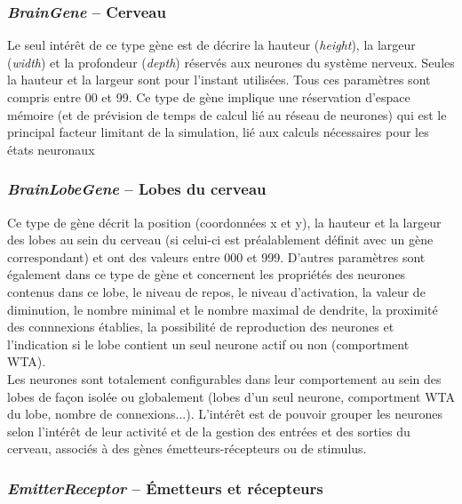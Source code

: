 \documentclass[11pt,twoside,a4paper]{article}
\begin{document}
\subsubsection{\emph{BrainGene} -- Cerveau}

Le seul int{\'e}r{\^e}t de ce type g{\`e}ne est de d{\'e}crire la hauteur (\textit{height}), la largeur (\textit{width}) et la profondeur (\textit{depth}) r{\'e}serv{\'e}s aux neurones du syst{\`e}me nerveux. Seules la hauteur et la largeur sont pour l'instant utilis{\'e}es. Tous ces param{\`e}tres sont compris entre 00 et 99. Ce type de g{\`e}ne implique une r{\'e}servation d'espace m{\'e}moire (et de pr{\'e}vision de temps de calcul li{\'e} au r{\'e}seau de neurones) qui est le principal facteur limitant de la simulation, li{\'e} aux calculs n{\'e}cessaires pour les {\'e}tats neuronaux

\subsubsection{\emph{BrainLobeGene} -- Lobes du cerveau}

Ce type de g{\`e}ne d{\'e}crit la position (coordonn{\'e}es x et y), la hauteur et la largeur des lobes au sein du cerveau (si celui-ci est pr{\'e}alablement d{\'e}finit avec un g{\`e}ne correspondant) et ont des valeurs entre 000 et 999. D'autres param{\`e}tres sont {\'e}galement dans ce type de g{\`e}ne et concernent les propri{\'e}t{\'e}s des neurones contenus dans ce lobe, le niveau de repos, le niveau d'activation, la valeur de diminution, le nombre minimal et le nombre maximal de dendrite, la proximit{\'e} des connnexions {\'e}tablies, la possibilit{\'e} de reproduction des neurones et l'indication si le lobe contient un seul neurone actif ou non (comportment WTA).~\\

Les neurones sont totalement configurables dans leur comportement au sein des lobes de fa\c{c}on isol{\'e}e ou globalement (lobes d'un seul neurone, comportment WTA du lobe, nombre de connexions...). L'int{\'e}r{\^e}t est de pouvoir grouper les neurones selon l'int{\'e}r{\^e}t de leur activit{\'e} et de la gestion des entr{\'e}es et des sorties du cerveau, associ{\'e}s {\`a} des g{\`e}nes {\'e}metteurs-r{\'e}cepteurs ou de stimulus. 

\subsubsection{\emph{EmitterReceptor} -- {\'E}metteurs et r{\'e}cepteurs}
\end{document}
